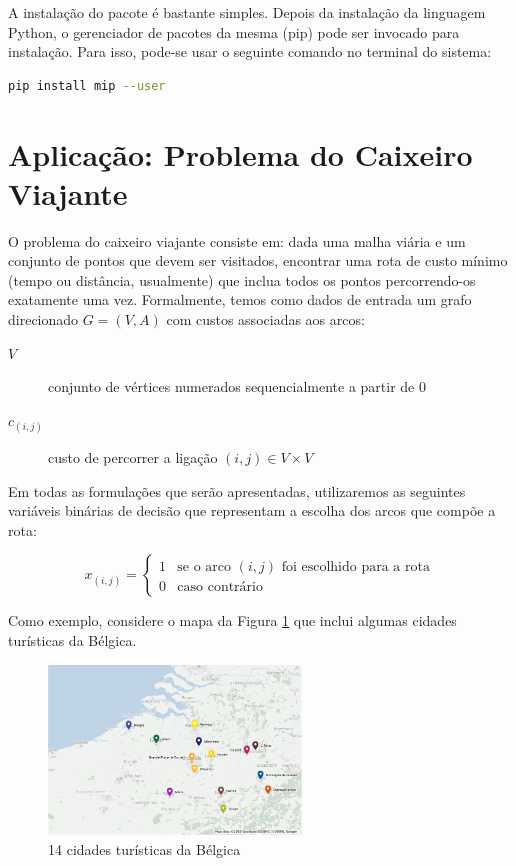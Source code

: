 \documentclass[a4paper,11pt,fleqn]{article}
\begin{document}
A instalação do pacote é bastante simples. Depois da instalação da linguagem Python, o gerenciador de pacotes da mesma (pip) pode ser invocado para instalação. Para isso, pode-se usar o seguinte comando no terminal do sistema:

\begin{lstlisting}[language=bash,numbers=none]
pip install mip --user
\end{lstlisting}

\section{Aplicação: Problema do Caixeiro Viajante}

O problema do caixeiro viajante consiste em: dada uma malha viária
e um conjunto de pontos que devem ser visitados, encontrar uma rota
de custo mínimo (tempo ou distância, usualmente) que inclua todos os pontos percorrendo-os exatamente uma vez. Formalmente, temos como dados de entrada um grafo direcionado $G=(V,A)$ com custos associadas aos arcos:
\begin{description}
	\item [{$V$}] conjunto de vértices numerados sequencialmente a partir
	de 0
	\item [{$c_{(i,j)}$}] custo de percorrer a ligação $(i, j) \in V \times V $
\end{description}

Em todas as formulações que serão apresentadas, utilizaremos as seguintes
variáveis binárias de decisão que representam a escolha dos arcos
que compõe a rota:

\[
x_{(i,j)}=\begin{cases}
1 & \textrm{se o arco }(i,j)\textrm{ foi escolhido para a rota}\\
0 & \textrm{caso contrário}
\end{cases}
\]

Como exemplo, considere o mapa da Figura \ref{figG} que inclui algumas cidades turísticas da Bélgica.

\begin{figure}
	\begin{centering}
		\includegraphics[width=0.6\textwidth]{../images/belgium-tourism-14.png}
		\par\end{centering}
	\caption{14 cidades turísticas da Bélgica}	
	\label{figG}
\end{figure}
\end{document}
